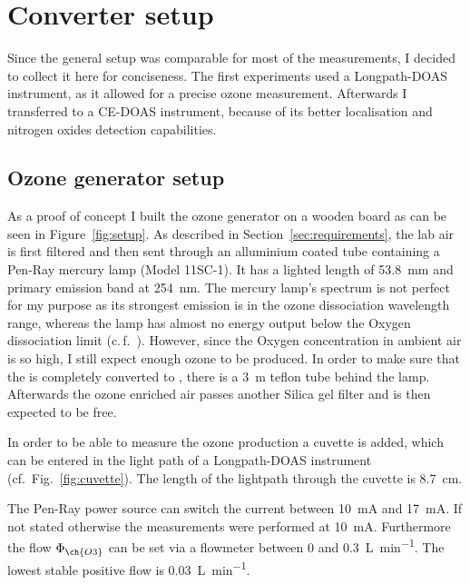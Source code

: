\section{Converter setup}
\label{sec:setup}

Since the general setup was comparable for most
of the measurements, I decided to collect it here for
conciseness. The first experiments used a Longpath-DOAS instrument, as
it allowed for a precise ozone measurement. Afterwards I transferred
to a CE-DOAS instrument, because of its better localisation and
nitrogen oxides detection capabilities.

\subsection{Ozone generator setup}
\label{sec:ozone-setup}

As a proof of concept I built the ozone generator on a wooden board as
can be seen in Figure~\ref{fig:setup}. As described in
Section~\ref{sec:requirements}, the lab air is first filtered and then
sent through an alluminium coated tube containing a Pen-Ray mercury
lamp (Model 11SC-1). It has a lighted length of
\SI{53.8}{\milli\meter} and primary emission band at
\SI{254}{\nano\meter}. The mercury lamp's spectrum is not perfect for
my purpose as its strongest emission is in the ozone dissociation
wavelength range, whereas the lamp has almost no energy output below
the Oxygen dissociation limit (c.\,f.~\cite{lamp}). However, since the
Oxygen concentration in ambient air is so high, I still expect enough
ozone to be produced. In order to make sure that the  is
completely converted to , there is a \SI{3}{\meter} teflon
tube behind the lamp. Afterwards the ozone enriched air passes another
Silica gel filter and is then expected to be  free.

In order to be able to measure the ozone production a cuvette is
added, which can be entered in the light path of a Longpath-DOAS
instrument (cf.\ Fig.~\ref{fig:cuvette}). The length of the lightpath
through the cuvette is \SI{8.7}{\centi\meter}.

The Pen-Ray power source can switch the current between
\SI{10}{\milli\ampere} and \SI{17}{\milli\ampere}. If not stated
otherwise the measurements were performed at \SI{10}{\milli\ampere}.
Furthermore the flow $\Phi_{\ch{O 3}}$ can be set via a flowmeter
between \num{0} and \SI{0.3}{\liter\per\minute}. The lowest stable
positive flow is \SI{0.03}{\liter\per\minute}.

